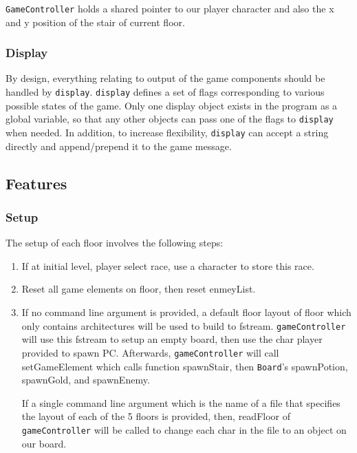 \documentclass[11pt]{article}
\theoremstyle{plain} \newtheorem{theorem*}{Theorem}[subsection]
\begin{document}
\texttt{GameController} holds a shared pointer to our player character and also
the x and y position of the stair of current floor.

\subsubsection{Display} 

By design, everything relating to output of the game
components should be handled by \texttt{display}. \texttt{display} defines a
set of flags corresponding to various possible states of the game. Only one
display object exists in the program as a global variable, so that any other
objects can pass one of the flags to \texttt{display} when needed.  In
addition, to increase flexibility, \texttt{display} can accept a string
directly and append/prepend it to the game message.\\





\subsection{Features}

\subsubsection{Setup}
The setup of each floor involves the following steps:
\begin{enumerate}[leftmargin=*]%
\item If at initial level, player select race, use a character to store this
	race.
\item Reset all game elements on \textsf{floor}, then reset \textsf{enmeyList}.
\item 
If no command line argument is provided, a default floor layout of floor which
only contains architectures will be used to build to fstream.
\texttt{gameController} will use this fstream to setup an empty board,
then use the char player provided to spawn PC. Afterwards,
\texttt{gameController} will call \textsf{setGameElement} which calls
function \textsf{spawnStair}, then \texttt{Board}'s \textsf{spawnPotion},
\textsf{spawnGold}, and \textsf{spawnEnemy}. 

If a single command line argument which is the name of a file that specifies
the layout of each of the 5 floors is provided, then, \textsf{readFloor} of
\texttt{gameController} will be called to change each char in the file to an
object on our board. 
\end{enumerate}
\end{document}
